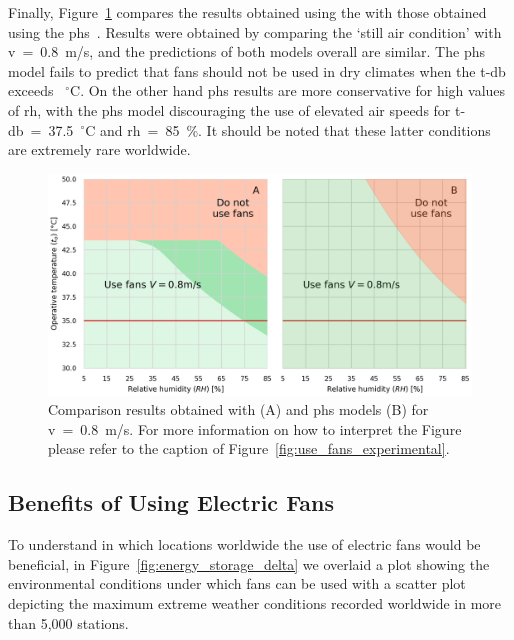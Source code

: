 Finally, Figure~\ref{fig:gagge_phs} compares the results obtained using the  with those obtained using the \ac{phs}~\cite{iso7933}.
Results were obtained by comparing the `still air condition' with \ac{v}~=~0.8~m/s, and the predictions of both models overall are similar.
The \ac{phs} model fails to predict that fans should not be used in dry climates when the \ac{t-db} exceeds ~$^{\circ}$C\@.
On the other hand \ac{phs} results are more conservative for high values of \ac{rh}, with the \ac{phs} model discouraging the use of elevated air speeds for \ac{t-db}~=~37.5~$^{\circ}$C and \ac{rh}~=~85~\%\@.
It should be noted that these latter conditions are extremely rare worldwide.

\begin{figure}[hbt!]
    \centering
    \includegraphics[width=\textwidth]{figures/phs_gagge}
    \caption{Comparison results obtained with  (A) and \ac{phs} models (B) for \ac{v}~=~0.8~m/s.
    For more information on how to interpret the Figure please refer to the caption of Figure~\ref{fig:use_fans_experimental}.}
    \label{fig:gagge_phs}
\end{figure}

\subsection{Benefits of Using Electric Fans}\label{subsec:use-fans}

To understand in which locations worldwide the use of electric fans would be beneficial, in Figure~\ref{fig:energy_storage_delta} we overlaid a plot showing the environmental conditions under which fans can be used with a scatter plot depicting the maximum extreme weather conditions recorded worldwide in more than 5,000 stations.

